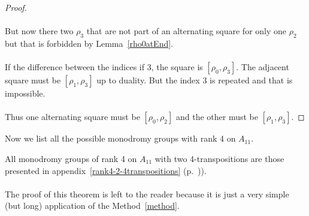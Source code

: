 \begin{proof}
\begin{figure}[H]
\begin{center}
      \caption{}
    \end{center}
  \end{figure}

  \paragraph{}
  But now there two $\rho_3$ that are not part of an alternating square for only one $\rho_2$ but that is forbidden by Lemma~\ref{rho0atEnd}.

  \paragraph{}
  If the difference between the indices if 3, the square is $[\rho_0, \rho_3]$. The adjacent square must be $[\rho_1, \rho_3]$ up to duality. But the index $3$ is repeated and that is impossible.

  \paragraph{}
  Thus one alternating square must be $[\rho_0, \rho_2]$ and the other must be $[\rho_1, \rho_3]$.

\end{proof}

Now we list all the possible monodromy groups with rank 4 on $A_{11}$.

\begin{theorem}
  All monodromy groups of rank 4 on $A_{11}$ with two 4-transpositions are those presented in appendix~\ref{rank4-2-4transpositions} (p.~\pageref{rank4-2-4transpositions})).
\end{theorem}

\paragraph{}
The proof of this theorem is left to the reader because it is just a very simple (but long) application of the Method~\ref{method}.

